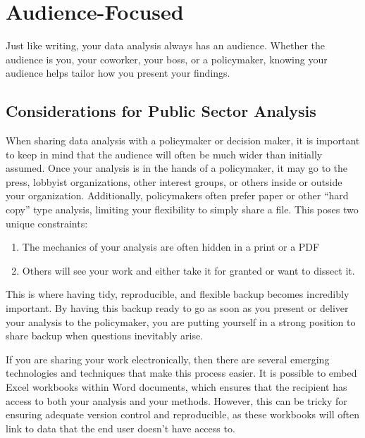 \documentclass[
]{book}
\providecommand{\tightlist}{%
  \setlength{\itemsep}{0pt}\setlength{\parskip}{0pt}}
\begin{document}
\hypertarget{audience-focused}{%
\chapter{Audience-Focused}\label{audience-focused}}

Just like writing, your data analysis always has an audience. Whether the audience is you, your coworker, your boss, or a policymaker, knowing your audience helps tailor how you present your findings.

\hypertarget{considerations-for-public-sector-analysis}{%
\section{Considerations for Public Sector Analysis}\label{considerations-for-public-sector-analysis}}

When sharing data analysis with a policymaker or decision maker, it is important to keep in mind that the audience will often be much wider than initially assumed. Once your analysis is in the hands of a policymaker, it may go to the press, lobbyist organizations, other interest groups, or others inside or outside your organization. Additionally, policymakers often prefer paper or other ``hard copy'' type analysis, limiting your flexibility to simply share a file. This poses two unique constraints:

\begin{enumerate}
\def\labelenumi{\arabic{enumi})}
\tightlist
\item
  The mechanics of your analysis are often hidden in a print or a PDF
\item
  Others will see your work and either take it for granted or want to dissect it.
\end{enumerate}

This is where having tidy, reproducible, and flexible backup becomes incredibly important. By having this backup ready to go as soon as you present or deliver your analysis to the policymaker, you are putting yourself in a strong position to share backup when questions inevitably arise.

If you are sharing your work electronically, then there are several emerging technologies and techniques that make this process easier. It is possible to embed Excel workbooks within Word documents, which ensures that the recipient has access to both your analysis and your methods. However, this can be tricky for ensuring adequate version control and reproducible, as these workbooks will often link to data that the end user doesn't have access to.
\end{document}
